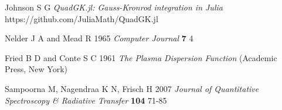 \documentclass[12pt]{iopart}
\begin{document}
\begin{thebibliography}{9}
Johnson S G \textit{QuadGK.jl: Gauss-Kronrod integration in Julia} https://github.com/JuliaMath/QuadGK.jl

Nelder J A and Mead R 1965 \textit{Computer Journal} \textbf{7} 4


Fried B D and Conte S C 1961 \textit{The Plasma Dispersion Function} (Academic Press, New York)

Sampoorna M, Nagendraa K N, Frisch H 2007 \textit{Journal of Quantitative Spectroscopy \& Radiative Transfer} \textbf{104} 71-85


\end{thebibliography}
\end{document}
